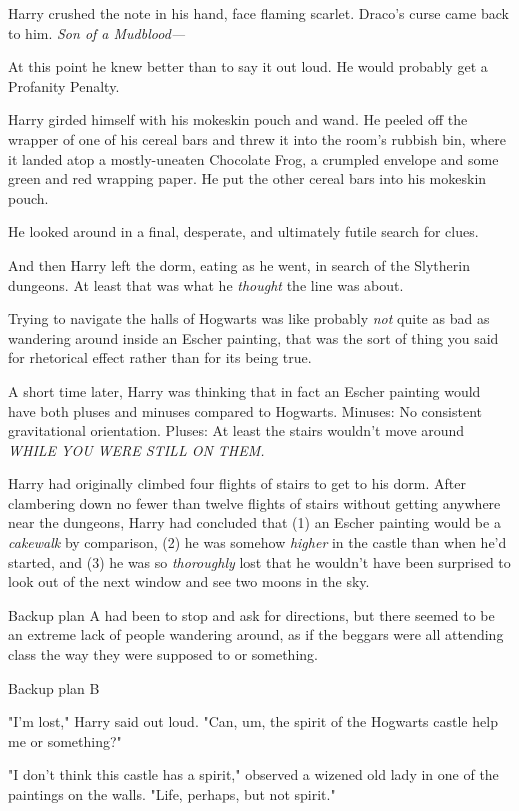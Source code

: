 Harry crushed the note in his hand, face flaming scarlet. Draco's curse came
back to him. \emph{Son of a Mudblood—}

At this point he knew better than to say it out loud. He would probably get a
Profanity Penalty.

Harry girded himself with his mokeskin pouch and wand. He peeled off the
wrapper of one of his cereal bars and threw it into the room's rubbish bin, where
it landed atop a mostly-uneaten Chocolate Frog, a crumpled envelope and some
green and red wrapping paper. He put the other cereal bars into his mokeskin
pouch.

He looked around in a final, desperate, and ultimately futile search for clues.

And then Harry left the dorm, eating as he went, in search of the Slytherin
dungeons. At least that was what he \emph{thought} the line was about.

Trying to navigate the halls of Hogwarts was like{\el} probably \emph{not}
quite as bad as wandering around inside an Escher painting, that was the sort
of thing you said for rhetorical effect rather than for its being true.

A short time later, Harry was thinking that in fact an Escher painting would
have both pluses and minuses compared to Hogwarts. Minuses: No consistent
gravitational orientation. Pluses: At least the stairs wouldn't move
around \emph{WHILE YOU WERE STILL ON THEM.}

Harry had originally climbed four flights of stairs to get to his dorm. After
clambering down no fewer than twelve flights of stairs without getting anywhere
near the dungeons, Harry had concluded that (1) an Escher painting would be a
\emph{cakewalk} by comparison, (2) he was somehow \emph{higher} in the castle
than when he'd started, and (3) he was so \emph{thoroughly} lost that he
wouldn't have been surprised to look out of the next window and see two moons
in the sky.

Backup plan A had been to stop and ask for directions, but there seemed to be
an extreme lack of people wandering around, as if the beggars were all
attending class the way they were supposed to or something.

Backup plan B{\el}

"I'm lost," Harry said out loud. "Can, um, the spirit of the Hogwarts castle
help me or something?"

"I don't think this castle has a spirit," observed a wizened old lady in one of
the paintings on the walls. "Life, perhaps, but not spirit."

